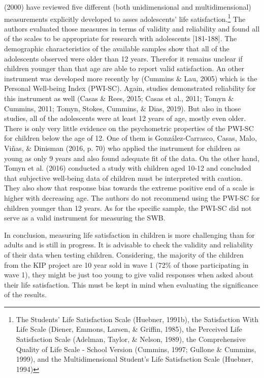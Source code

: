 \documentclass[a4, 12pt]{article}
\let\rmarkdownfootnote\footnote%
\def\footnote{\protect\rmarkdownfootnote}
\begin{document}
(2000) have reviewed five different (both unidimensional and multidimensional) measurements explicitly developed to asses adolescents' life satisfaction.\footnote{The Students' Life Satisfaction Scale (Huebner, 1991b), the Satisfaction With Life Scale (Diener, Emmons, Larsen, \& Griffin, 1985), the Perceived Life Satisfaction Scale (Adelman, Taylor, \& Nelson, 1989), the Comprehensive Quality of Life Scale - School Version (Cummins, 1997; Gullone \& Cummins, 1999), and the Multidimensional Student's Life Satisfaction Scale (Huebner, 1994)} The authors evaluated those measures in terms of validity and reliability and found all of the scales to be appropriate for research with adolescents {[}181-188{]}. The demographic characteristics of the available samples show that all of the adolescents observed were older than 12 years. Therefor it remains unclear if children younger than that age are able to report valid satisfaction.
An other instrument was developed more recently by (Cummins \& Lau, 2005) which is the Personal Well-being Index (PWI-SC). Again, studies demonstrated reliability for this instrument as well (Casas \& Rees, 2015; Casas et al., 2011; Tomyn \& Cummins, 2011; Tomyn, Stokes, Cummins, \& Dias, 2019). But also in those studies, all of the adolescents were at least 12 years of age, mostly even older. There is only very little evidence on the psychometric properties of the PWI-SC for children below the age of 12.
One of them is González-Carrasco, Casas, Malo, Viñas, \& Dinisman (2016, p. 70) who applied the instrument for children as young as only 9 years and also found adequate fit of the data.
On the other hand, Tomyn et al. (2016) conducted a study with children aged 10-12 and concluded that subjective well-being data of children must be interpreted with caution. They also show that response bias towards the extreme positive end of a scale is higher with decreasing age. The authors do not recommend using the PWI-SC for children younger than 12 years. As for the specific sample, the PWI-SC did not serve as a valid instrument for measuring the SWB.

In conclusion, measuring life satisfaction in children is more challenging than for adults and is still in progress. It is advisable to check the validity and reliability of their data when testing children. Considering, the majority of the children from the KIP project are 10 year sold in wave 1 (72\% of those participating in wave 1), they might be just too young to give valid responses when asked about their life satisfaction. This must be kept in mind when evaluating the significance of the results.
\end{document}
